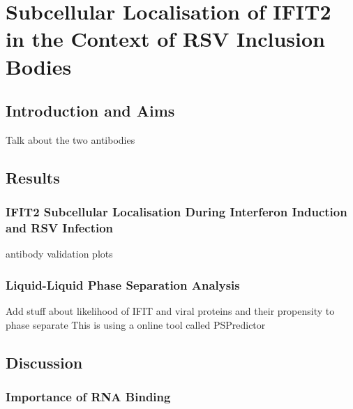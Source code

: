 \chapter{Subcellular Localisation of IFIT2 in the Context of RSV Inclusion Bodies} \label{ch:Subcellular Localisation of IFIT2 in the Context of RSV Inclusion Bodies}
\section{Introduction and Aims} \label{sec:Introduction and Aims-Chapter5}
Talk about the two antibodies

\section{Results} \label{sec:Results-Chapter5}
\subsection{IFIT2 Subcellular Localisation During Interferon Induction and RSV
Infection} \label{subsec:IFIT2 Subcellular Localisation During Interferon Induction and RSV
Infection}
antibody validation plots

\lipsum[1-5]







\subsection{Liquid-Liquid Phase Separation Analysis} \label{subsec:Liquid-Liquid Phase Separation Analysis}
Add stuff about likelihood of IFIT and viral proteins and their propensity to phase separate \newline
This is using a online tool called PSPredictor


\section{Discussion} \label{sec:Discussion-Chapter5}


\subsection{Importance of RNA Binding} \label{subsec:Importance of RNA Binding}
\lipsum[1-3]